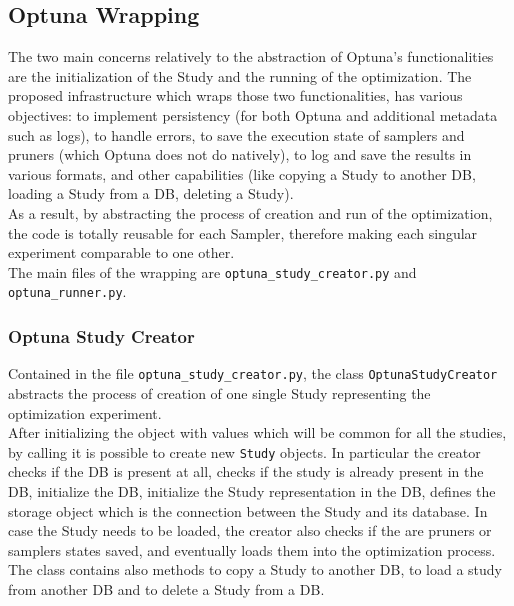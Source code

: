 \subsection{Optuna Wrapping}

The two main concerns relatively to the abstraction of Optuna's functionalities are the initialization of the Study and the running of the optimization.
The proposed infrastructure which wraps those two functionalities, has various objectives: to implement persistency (for both Optuna and additional metadata such as logs), to handle errors, to save the execution state of samplers and pruners (which Optuna does not do natively), to log and save the results in various formats, and other capabilities (like copying a Study to another DB, loading a Study from a DB, deleting a Study).
\\[0.3cm]As a result, by abstracting the process of creation and run of the optimization, the code is totally reusable for each Sampler, therefore making each singular experiment comparable to one other.
\\[0.3cm]The main files of the wrapping are \texttt{optuna\_study\_creator.py} and \texttt{optuna\_runner.py}.

\subsubsection{Optuna Study Creator}

Contained in the file \texttt{optuna\_study\_creator.py}, the class \texttt{OptunaStudyCreator} abstracts the process of creation of one single Study representing the optimization experiment.
% 
\\[0.3cm]After initializing the object with values which will be common for all the studies, by calling it is possible to create new \texttt{Study} objects.
In particular the creator checks if the DB is present at all, checks if the study is already present in the DB, initialize the DB, initialize the Study representation in the DB, defines the storage object which is the connection between the Study and its database.
In case the Study needs to be loaded, the creator also checks if the are pruners or samplers states saved, and eventually loads them into the optimization process.
% 
\\[0.3cm]The class contains also methods to copy a Study to another DB, to load a study from another DB and to delete a Study from a DB.


